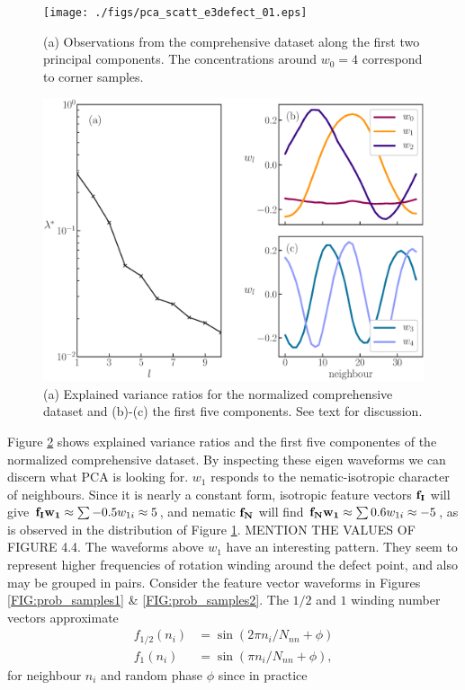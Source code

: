 \begin{figure}[!t]
	\centering
	\texttt{[image: ./figs/pca\_scatt\_e3defect\_01.eps]}
	\caption{(a) Observations from the comprehensive dataset along the first two principal components. The concentrations around $w_0 = 4$ correspond to corner samples.
	}
\label{FIG:pca_scatt}
\end{figure}
		
\begin{figure}[!t]
	\centering
		\includegraphics[width=\columnwidth]{./figs/pca_all_e3defect.eps}
	\caption{(a) Explained variance ratios for the normalized comprehensive dataset and (b)-(c) the first five components. See text for discussion.
}
\label{FIG:pca_all}
\end{figure}

Figure \ref{FIG:pca_all} shows explained variance ratios and the first five componentes of the normalized comprehensive dataset. By inspecting these eigen waveforms we can discern what PCA is looking for. $w_1$ responds to the nematic-isotropic character of neighbours. Since it is nearly a constant form, isotropic feature vectors $\mathbf{f_I}$ will give $\mathbf{f_Iw_1} \approx \sum -0.5w_{1i} \approx 5$, and nematic $\mathbf{f_N}$ will find $\mathbf{f_Nw_1} \approx \sum 0.6w_{1i} \approx -5$, as is observed in the distribution of Figure \ref{FIG:pca_scatt}. MENTION THE VALUES OF FIGURE 4.4.
The waveforms above $w_1$ have an interesting pattern. They seem to represent higher frequencies of rotation winding around the defect point, and also may be grouped in pairs. Consider the feature vector waveforms in Figures \ref{FIG:prob_samples1} \& \ref{FIG:prob_samples2}. The $1/2$ and $1$ winding number vectors approximate
\begin{align}
f_{1/2}(n_i) &= \sin(2\pi n_i/N_{nn} + \phi)\\
f_{1}(n_i) &= \sin(\pi n_i/N_{nn} + \phi),
\end{align}
for neighbour $n_i$ and random phase $\phi$ since in practice 


